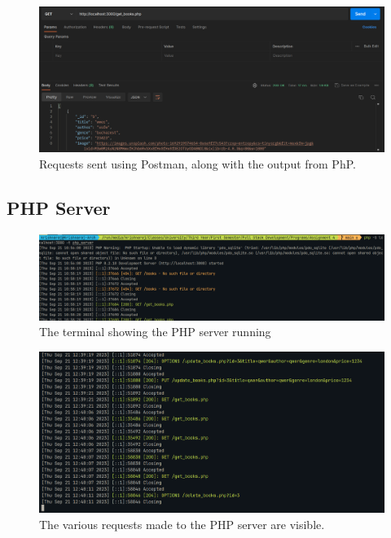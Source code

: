 \documentclass[11pt]{article}
\begin{document}
\begin{figure}[H]
    \centering
    \includegraphics[width=.95\textwidth]{screenshots/postman 3.png}
    \caption{Requests sent using Postman, along with the output from PhP. }
\end{figure}

\subsection{PHP Server}

\begin{figure}[H]
    \centering
    \includegraphics[width=.95\textwidth]{screenshots/php server 1.png}
    \caption{The terminal showing the PHP server running}
\end{figure}
\begin{figure}[H]
    \centering
    \includegraphics[width=.95\textwidth]{screenshots/php server 2.png}
    \caption{The various requests made to the PHP server are visible. }
\end{figure}
\end{document}
